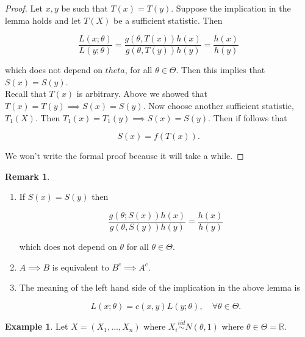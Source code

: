 \documentclass[12pt]{article}
\theoremstyle{definition}
\newtheorem*{example}{Example}
\newtheorem*{remark}{Remark}
\begin{document}
\begin{proof}
Let $x, y$ be such that $T(x) = T(y)$. Suppose the implication in the lemma
holds and let $T(X)$ be a sufficient statistic. Then

\begin{equation*}
\frac{L(x; \theta)}{L(y; \theta)} = \frac{g(\theta, T(x))h(x)}{g(\theta, T(y))h(y)}
= \frac{h(x)}{h(y)}
\end{equation*}

which does not depend on $theta$, for all $\theta \in \Theta$. Then this implies
that $S(x) = S(y)$. \\

Recall that $T(x)$ is arbitrary. Above we showed that $T(x) = T(y) \implies S(x) = S(y)$.
Now choose another sufficient statistic, $T_1(X)$. Then 
$T_1(x) = T_1(y) \implies S(x) = S(y)$. Then if follows that

$$ S(x) = f(T(x)).$$

We won't write the formal proof because it will take a while.
\end{proof}

\begin{remark}


\begin{enumerate}[label = (\arabic*)]
\item If $S(x) = S(y)$ then 

\begin{equation*}
\frac{g(\theta; S(x))h(x)}{g(\theta, S(y))h(y)} = \frac{h(x)}{h(y)}
\end{equation*}

which does not depend on $\theta$ for all $\theta \in \Theta$.

\item $A \implies B$ is equivalent to $B^c \implies A^c$.

\item The meaning of the left hand side of the implication in the above
lemma is

\begin{equation*}
L(x; \theta) = c(x, y)L(y; \theta), \quad \forall \theta \in \Theta.
\end{equation*}

\end{enumerate}
\end{remark}

\begin{example}
Let $X = (X_1, \ldots, X_n)$ where $X_i \overset{iid}{\sim} N(\theta, 1)$ where
$\theta \in \Theta = \mathbb{R}$.
\end{example}
\end{document}
